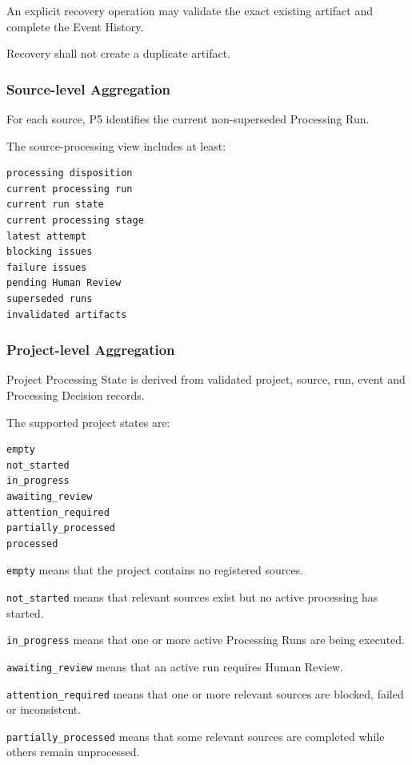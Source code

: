 An explicit recovery operation may validate the exact existing artifact and complete the Event History.

Recovery shall not create a duplicate artifact.

\hypertarget{source-level-aggregation}{%
\subsubsection{Source-level Aggregation}\label{source-level-aggregation}}

For each source, P5 identifies the current non-superseded Processing Run.

The source-processing view includes at least:

\begin{verbatim}
processing disposition
current processing run
current run state
current processing stage
latest attempt
blocking issues
failure issues
pending Human Review
superseded runs
invalidated artifacts
\end{verbatim}

\hypertarget{project-level-aggregation}{%
\subsubsection{Project-level Aggregation}\label{project-level-aggregation}}

Project Processing State is derived from validated project, source, run, event and Processing Decision records.

The supported project states are:

\begin{verbatim}
empty
not_started
in_progress
awaiting_review
attention_required
partially_processed
processed
\end{verbatim}

\texttt{empty} means that the project contains no registered sources.

\texttt{not\_started} means that relevant sources exist but no active processing has started.

\texttt{in\_progress} means that one or more active Processing Runs are being executed.

\texttt{awaiting\_review} means that an active run requires Human Review.

\texttt{attention\_required} means that one or more relevant sources are blocked, failed or inconsistent.

\texttt{partially\_processed} means that some relevant sources are completed while others remain unprocessed.

